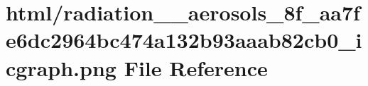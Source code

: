 \hypertarget{radiation____aerosols__8f__aa7fe6dc2964bc474a132b93aaab82cb0__icgraph_8png}{}\section{html/radiation\+\_\+\+\_\+aerosols\+\_\+8f\+\_\+aa7fe6dc2964bc474a132b93aaab82cb0\+\_\+icgraph.png File Reference}
\label{radiation____aerosols__8f__aa7fe6dc2964bc474a132b93aaab82cb0__icgraph_8png}
